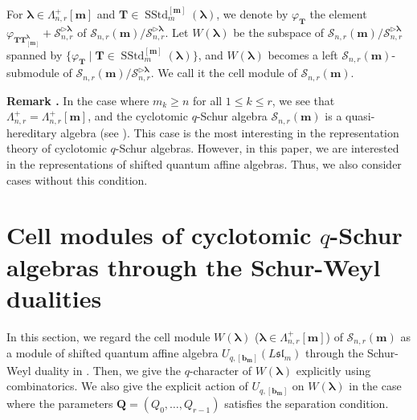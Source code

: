 \documentclass[12pt]{amsart}
\def \remark{\refstepcounter{thm} \par\medskip\noindent
                \textbf{Remark \thethm .} }
\numberwithin{equation}{thm}
\newcommand\bQ{\mathbf Q}
\newcommand\bT{\mathbf T}
\newcommand\bb{\mathbf b}
\renewcommand\bm{\mathbf m} %
\newcommand\sS{\mathscr S}
\newcommand\vf{\varphi}
\newcommand\vL{\varLambda}
\newcommand\Bla{\boldsymbol\lambda}
\newcommand\trr{\triangleright }
\newcommand\Fsl{\mathfrak{sl}}
\newcommand{\SStd}{\operatorname{SStd}}
\begin{document}
For $\Bla \in \vL_{n,r}^+[\bm]$ and $\bT \in \SStd_m^{[\bm]}(\Bla)$, 
we denote by $\vf_{\bT}$ 
the element $\vf_{\bT \bT^{\Bla}_{[\bm]}} + \sS_{n,r}^{\trr \Bla}$ of $\sS_{n,r}(\bm) / \sS_{n,r}^{\trr \Bla}$. 
Let $W(\Bla)$ be the subspace of $\sS_{n,r}(\bm)/ \sS_{n,r}^{\trr \Bla}$ spanned by 
$\{\vf_{\bT} \mid \bT \in \SStd_m^{[\bm]}(\Bla)\}$, 
and $W(\Bla)$ becomes a left $\sS_{n,r}(\bm)$-submodule of $\sS_{n,r}(\bm)/ \sS_{n,r}^{\trr \Bla}$. 
We call it the cell module of $\sS_{n,r}(\bm)$. 

\remark 
In the case where $m_k \geq n$ for all $1 \leq k \leq r$, 
we see that $\vL_{n,r}^+ = \vL_{n,r}^+[\bm]$, 
and the cyclotomic $q$-Schur algebra $\sS_{n,r}(\bm)$ is a quasi-hereditary algebra 
(see \cite[Theorem 4.14]{Mat04}). 
This case is the most interesting in the representation theory of cyclotomic $q$-Schur algebras. 
However, in this paper, we are interested in the representations of shifted quantum affine algebras. 
Thus, we also consider cases without this condition.  



\section{Cell modules of  cyclotomic $q$-Schur algebras through the Schur-Weyl dualities}

In this section, 
we regard the cell module $W(\Bla)$ ($\Bla \in \vL_{n,r}^+[\bm]$) of $\sS_{n,r}(\bm)$ 
as a module of shifted quantum affine algebra $U_{q,[\bb_{\bm}]}(L\Fsl_m)$ 
through the Schur-Weyl duality in \cite{Wad24}. 
Then, we give the $q$-character of $W(\Bla)$ explicitly using combinatorics. 
We also give the explicit action of $U_{q,[\bb_{\bm}]}$ on $W(\Bla)$ 
in the case where the parameters $\bQ=(Q_0,\dots, Q_{r-1})$ satisfies the separation condition. 
\end{document}
